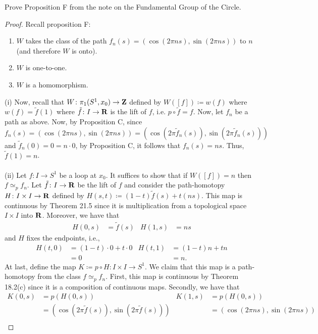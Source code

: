 \newpage
\begin{problem}[(A)]
Prove Proposition F from the note on the Fundamental Group of the
Circle.
\end{problem}
\begin{proof}
Recall proposition F:
\begin{proposition*}[F]
\begin{enumerate}[label={\normalfont(\roman*)}]
\item $W$ takes the class of the path $f_n(s)=(\cos(2\pi ns),\sin(2\pi
  ns))$ to $n$ (and therefore $W$ is onto).
\item $W$ is one-to-one.
\item $W$ is a homomorphism.
\end{enumerate}
\end{proposition*}
(i) Now, recall that $W\colon\pi_1(S^1,x_0)\to\mathbf{Z}$ defined by
$W([f])\coloneqq w(f)$ where $w(f)=\tilde f(1)$ where $\tilde f\colon
I\to\mathbf{R}$ is the lift of $f$, i.e. $p\circ \tilde f=f$. Now, let $f_n$ be a
path as above. Now, by Proposition C, since
\[
f_n(s)=(\cos(2\pi ns),\sin(2\pi ns))=(\cos(2\pi\tilde
f_n(s)),\sin(2\pi\tilde f_n(s)))
\]
and $\tilde f_n(0)=0=n\cdot 0$, by Proposition C, it follows that
$f_n(s)=ns$. Thus, $\tilde f(1)=n$.
\\\\
(ii) Let $f\colon I\to S^1$ be a loop at $x_0$. It suffices to show that if
$W([f])=n$ then $f\simeq_p f_n$. Let $\tilde f\colon I\to\mathbf{R}$ be the lift
of $f$ and consider the path-homotopy $H\colon I\times I\to\mathbf{R}$ defined by
$H(s,t)\coloneqq (1-t)\tilde f(s)+t(ns)$. This map is continuous by
Theorem 21.5 since it is multiplication from a topological space $I\times
I$ into $\mathbf{R}$. Moreover, we have that
\begin{align*}
H(0,s)&=\tilde f(s)&H(1,s)&=ns
\end{align*}
and $H$ fixes the endpoints, i.e.,
\begin{align*}
H(t,0)&=(1-t)\cdot 0+t\cdot 0&
H(t,1)&=(1-t)n+tn\\
&=0&
&=n.
\end{align*}
At last, define the map $K\coloneqq p\circ H\colon I\times I\to S^1$. We
claim that this map is a path-homotopy from the class $f\simeq_p
f_n$. First, this map is continuous by Theorem 18.2(c) since it is a
composition of continuous maps. Secondly, we have that
\begin{align*}
K(0,s)&=p(H(0,s))&
K(1,s)&=p(H(0,s))\\
&=(\cos(2\pi\tilde f(s)),\sin(2\pi\tilde f(s)))&
&=(\cos(2\pi ns),\sin(2\pi ns))\\

\end{align*}
\end{proof}
